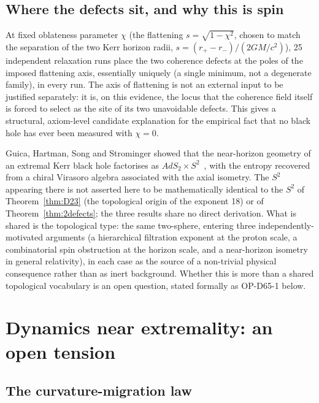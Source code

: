 \documentclass[12pt,a4paper]{article}
\newcommand{\chif}{\chi}
\begin{document}
\subsection{Where the defects sit, and why this is spin}

At fixed oblateness parameter $\chif$ (the flattening
$s=\sqrt{1-\chif^2}$, chosen to match the separation of the two
Kerr horizon radii, $s=(r_+-r_-)/(2GM/c^2)$), 25 independent
relaxation runs place the two coherence defects at the poles of the
imposed flattening axis, essentially uniquely (a single minimum,
not a degenerate family), in every run. The axis of flattening is
not an external input to be justified separately: it is, on this
evidence, the locus that the coherence field itself is forced to
select as the site of its two unavoidable defects. This gives a
structural, axiom-level candidate explanation for the empirical
fact that no black hole has ever been measured with $\chif=0$.

\begin{speculativebox}
Guica, Hartman, Song and Strominger showed that the near-horizon
geometry of an extremal Kerr black hole factorises as
$AdS_2\times S^2$~\citep{GuicaHartmanSongStrominger2009}, with the
entropy recovered from a chiral Virasoro algebra associated with
the axial isometry. The $S^2$ appearing there is not asserted here
to be mathematically identical to the $S^2$ of
Theorem~\ref{thm:D23} (the topological origin of the exponent 18)
or of Theorem~\ref{thm:2defects}; the three results share no direct
derivation. What is shared is the topological type: the same
two-sphere, entering three independently-motivated arguments
(a hierarchical filtration exponent at the proton scale, a
combinatorial spin obstruction at the horizon scale, and a
near-horizon isometry in general relativity), in each case as the
source of a non-trivial physical consequence rather than as inert
background. Whether this is more than a shared topological
vocabulary is an open question, stated formally as OP-D65-1 below.
\end{speculativebox}

\section{Dynamics near extremality: an open tension}
\label{sec:dynamics}

\subsection{The curvature-migration law}
\end{document}
